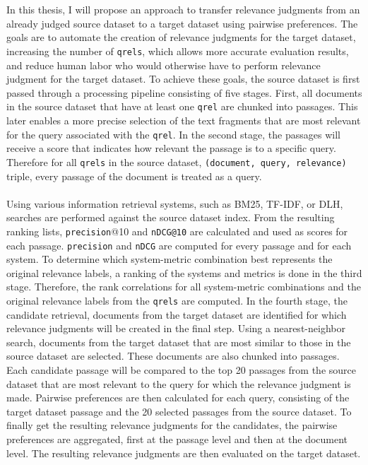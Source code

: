 \\\\
In this thesis, I will propose an approach to transfer relevance judgments from an already judged source dataset to a target dataset using pairwise preferences. The goals are to automate the creation of relevance judgments for the target dataset, increasing the number of \texttt{qrels}, which allows more accurate evaluation results, and reduce human labor who would otherwise have to perform relevance judgment for the target dataset. To achieve these goals, the source dataset is first passed through a processing pipeline consisting of five stages. First, all documents in the source dataset that have at least one \texttt{qrel} are chunked into passages. This later enables a more precise selection of the text fragments that are most relevant for the query associated with the \texttt{qrel}. In the second stage, the passages will receive a score that indicates how relevant the passage is to a specific query. Therefore for all \texttt{qrels} in the source dataset, \texttt{(document, query, relevance)} triple, every passage of the document is treated as a query.
\\\\
Using various information retrieval systems, such as BM25, TF-IDF, or DLH, searches are performed against the source dataset index. From the resulting ranking lists, \texttt{precision}@10 and \texttt{nDCG@10} are calculated and used as scores for each passage. \texttt{precision} and \texttt{nDCG} are computed for every passage and for each system. To determine which system-metric combination best represents the original relevance labels, a ranking of the systems and metrics is done in the third stage. Therefore, the rank correlations for all system-metric combinations and the original relevance labels from the \texttt{qrels} are computed. In the fourth stage, the candidate retrieval, documents from the target dataset are identified for which relevance judgments will be created in the final step. Using a nearest-neighbor search, documents from the target dataset that are most similar to those in the source dataset are selected. These documents are also chunked into passages. Each candidate passage will be compared to the top 20 passages from the source dataset that are most relevant to the query for which the relevance judgment is made. Pairwise preferences are then calculated for each query, consisting of the target dataset passage and the 20 selected passages from the source dataset. To finally get the resulting relevance judgments for the candidates, the pairwise preferences are aggregated, first at the passage level and then at the document level. The resulting relevance judgments are then evaluated on the target dataset.